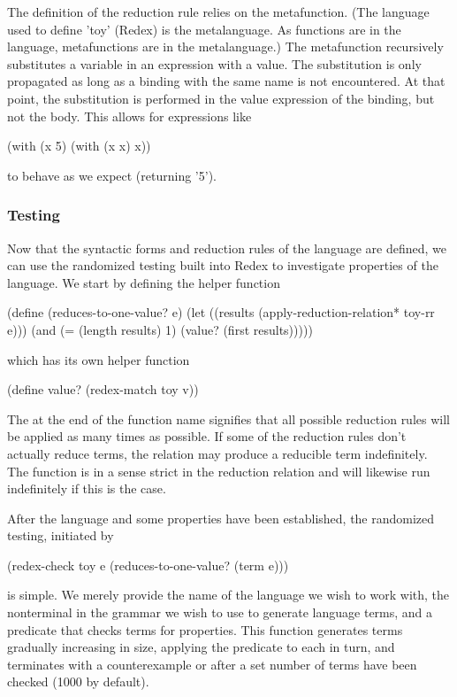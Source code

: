 The definition of the  reduction rule relies on the 
metafunction. (The language used to define \scheme'toy' (Redex) is the metalanguage. 
As functions are in the language, metafunctions are in the metalanguage.) The
 metafunction recursively substitutes a variable in an expression with
a value. The substitution is only propagated as long as a binding with the same name is
not encountered. At that point, the substitution is performed in the value expression of
the binding, but not the body. This allows for expressions like
\begin{schemeblock}
\begin{schemedisplay}
(with (x 5)
  (with (x x)
    x))
\end{schemedisplay}
\end{schemeblock}
to behave as we expect (returning \scheme'5').

\subsubsection{Testing}

Now that the syntactic forms and reduction rules of the language are defined, we can use 
the randomized testing built into Redex to investigate properties of the language. We 
start by defining the helper function 
\begin{schemeblock}
\begin{schemedisplay}
(define (reduces-to-one-value? e)
  (let ((results (apply-reduction-relation* toy-rr e)))
    (and (= (length results) 1)
         (value? (first results)))))
\end{schemedisplay}
\end{schemeblock}
which has its own helper function 
\begin{schemeblock}
\begin{schemedisplay}
(define value? (redex-match toy v))
\end{schemedisplay}
\end{schemeblock}
The \scheme{*} at the end of the function name 
signifies that all possible reduction rules will be applied as many times as possible. If
some of the reduction rules don't actually reduce terms, the relation may produce a
reducible term indefinitely. The function  is in a sense
strict in the reduction relation and will likewise run indefinitely if this is the case.

After the language and some properties have been established, the randomized testing, 
initiated by
\begin{schemedisplay}
(redex-check toy e (reduces-to-one-value? (term e)))
\end{schemedisplay}
is simple. We merely provide the name of the language we wish to work with, the
nonterminal in the grammar we wish to use to generate language terms, and a predicate that
checks terms for properties. This function generates terms gradually increasing in size,
applying the predicate to each in turn, and terminates with a counterexample or after a
set number of terms have been checked (1000 by default).

